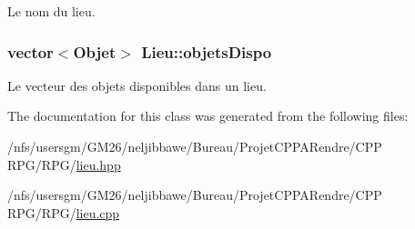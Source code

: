 Le nom du lieu. 

\hypertarget{class_lieu_a3a65fbb8ecba3f2e265905730ad2e631}{
\subsubsection[{objets\-Dispo}]{\setlength{\rightskip}{0pt plus 5cm}vector$<${\bf Objet}$>$ Lieu\-::objets\-Dispo\hspace{0.3cm}{\ttfamily [protected]}}}\label{class_lieu_a3a65fbb8ecba3f2e265905730ad2e631}


Le vecteur des objets disponibles dans un lieu. 



The documentation for this class was generated from the following files\-:\begin{DoxyCompactItemize}
\item 
/nfs/usersgm/\-G\-M26/neljibbawe/\-Bureau/\-Projet\-C\-P\-P\-A\-Rendre/\-C\-P\-P R\-P\-G/\-R\-P\-G/\hyperlink{lieu_8hpp}{lieu.\-hpp}\item 
/nfs/usersgm/\-G\-M26/neljibbawe/\-Bureau/\-Projet\-C\-P\-P\-A\-Rendre/\-C\-P\-P R\-P\-G/\-R\-P\-G/\hyperlink{lieu_8cpp}{lieu.\-cpp}\end{DoxyCompactItemize}
